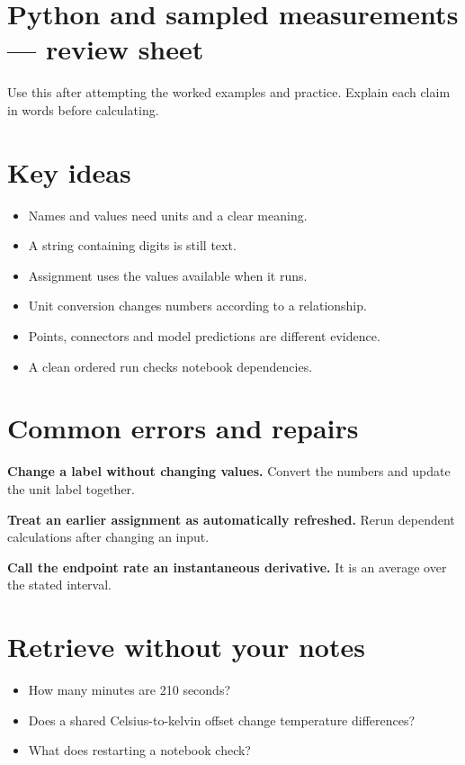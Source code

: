 \documentclass[11pt,letterpaper]{article}
\theoremstyle{definition}\newtheorem{definition}{Definition}\newtheorem{example}{Example}
\numberwithin{equation}{section}
\begin{document}
\section*{Python and sampled measurements --- review sheet}
Use this after attempting the worked examples and practice. Explain each claim in words before calculating.

\section*{Key ideas}
\begin{itemize}
\item Names and values need units and a clear meaning.
\item A string containing digits is still text.
\item Assignment uses the values available when it runs.
\item Unit conversion changes numbers according to a relationship.
\item Points, connectors and model predictions are different evidence.
\item A clean ordered run checks notebook dependencies.
\end{itemize}
\section*{Common errors and repairs}
\textbf{Change a label without changing values.} Convert the numbers and update the unit label together.

\textbf{Treat an earlier assignment as automatically refreshed.} Rerun dependent calculations after changing an input.

\textbf{Call the endpoint rate an instantaneous derivative.} It is an average over the stated interval.

\section*{Retrieve without your notes}
\begin{itemize}
\item How many minutes are 210 seconds?
\item Does a shared Celsius-to-kelvin offset change temperature differences?
\item What does restarting a notebook check?
\end{itemize}
\end{document}
